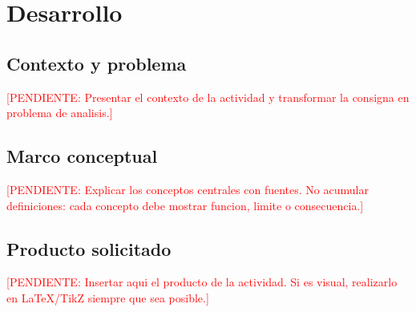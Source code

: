 \documentclass[
	spanish,
	letterpaper, oneside
]{article}
\newcommand{\pendiente}[1]{\textcolor{red}{[PENDIENTE: #1]}}
\begin{document}
%
%
\section{Desarrollo}

\subsection{Contexto y problema}

\pendiente{Presentar el contexto de la actividad y transformar la consigna en problema de analisis.}

\subsection{Marco conceptual}

\pendiente{Explicar los conceptos centrales con fuentes. No acumular definiciones: cada concepto debe mostrar funcion, limite o consecuencia.}

\subsection{Producto solicitado}

\pendiente{Insertar aqui el producto de la actividad. Si es visual, realizarlo en LaTeX/TikZ siempre que sea posible.}
\end{document}
